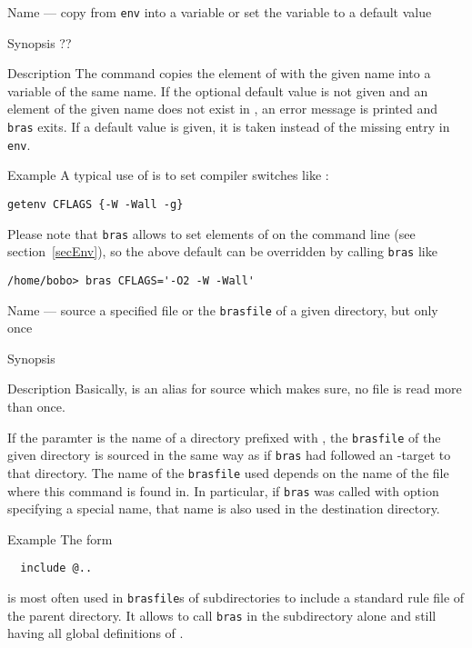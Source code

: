 \documentclass[12pt]{article}
\newcommand{\bras}{\texttt{bras}}
\newcommand{\brasfile}{\texttt{brasfile}}
\begin{document}
\begin{Describe}
\item[Name]  --- copy from \texttt{env} into a variable
  or set the variable to a default value
\item[Synopsis]   ??
\item[Description] The command copies the element of  with
  the given name into a variable of the same name. If the optional
  default value is not given and an element of the given name does not
  exist in , an error message is printed and \bras{} exits. If
  a default value is given, it is taken instead of the missing entry
  in \texttt{env}. 
\item[Example] A typical use of  is to set compiler
  switches like :
\begin{verbatim}
getenv CFLAGS {-W -Wall -g}
\end{verbatim}

Please note that \bras{} allows to set elements of  on the
command line (see section~\ref{secEnv}), so the above default can be
overridden by calling \bras{} like
\begin{verbatim}
/home/bobo> bras CFLAGS='-O2 -W -Wall'
\end{verbatim}
\end{Describe}


\begin{Describe}
\item[Name]  --- source a specified file or the
  \brasfile{} of a given directory, but only once
\item[Synopsis]  \\
   
\item[Description] Basically,  is an alias for source
  which makes sure, no file is read more than once. 
  
  If the paramter is the name of a directory prefixed with , the
  \brasfile{} of the given directory is sourced in the same way as if
  \bras{} had followed an -target to that directory. The name of
  the \brasfile{} used depends on the name of the file where this
  command is found in. In particular, if \bras{} was called with
  option  specifying a special name, that name is also used in
  the destination directory.
\item[Example]
  The form
  \begin{verbatim}
  include @..
  \end{verbatim}
  is most often used in \brasfile{}s of subdirectories to include a
  standard rule file of the parent directory. It allows to call
  \bras{} in the subdirectory alone and still having all global
  definitions of .
\end{Describe}
\end{document}
